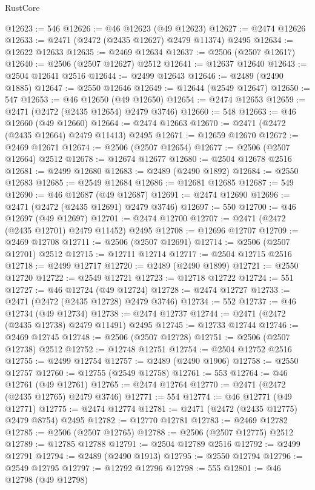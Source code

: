 \begin{lexlean}{RustCore}
\begin{coremodule}
@12623 := 546
@12626 := @46 @12623 (@49 @12623)
@12627 := @2474 @12626
@12633 := @2471 (@2472 (@2435 @12627) @2479 @11374) @2495
@12634 := @12622 @12633
@12635 := @2469 @12634
@12637 := @2506 (@2507 @12617)
@12640 := @2506 (@2507 @12627) @2512
@12641 := @12637 @12640
@12643 := @2504 @12641 @2516
@12644 := @2499 @12643
@12646 := @2489 (@2490 @1885)
@12647 := @2550 @12646
@12649 := @12644 (@2549 @12647)
@12650 := 547
@12653 := @46 @12650 (@49 @12650)
@12654 := @2474 @12653
@12659 := @2471 (@2472 (@2435 @12654) @2479 @3746)
@12660 := 548
@12663 := @46 @12660 (@49 @12660)
@12664 := @2474 @12663
@12670 := @2471 (@2472 (@2435 @12664) @2479 @11413) @2495
@12671 := @12659 @12670
@12672 := @2469 @12671
@12674 := @2506 (@2507 @12654)
@12677 := @2506 (@2507 @12664) @2512
@12678 := @12674 @12677
@12680 := @2504 @12678 @2516
@12681 := @2499 @12680
@12683 := @2489 (@2490 @1892)
@12684 := @2550 @12683
@12685 := @2549 @12684
@12686 := @12681 @12685
@12687 := 549
@12690 := @46 @12687 (@49 @12687)
@12691 := @2474 @12690
@12696 := @2471 (@2472 (@2435 @12691) @2479 @3746)
@12697 := 550
@12700 := @46 @12697 (@49 @12697)
@12701 := @2474 @12700
@12707 := @2471 (@2472 (@2435 @12701) @2479 @11452) @2495
@12708 := @12696 @12707
@12709 := @2469 @12708
@12711 := @2506 (@2507 @12691)
@12714 := @2506 (@2507 @12701) @2512
@12715 := @12711 @12714
@12717 := @2504 @12715 @2516
@12718 := @2499 @12717
@12720 := @2489 (@2490 @1899)
@12721 := @2550 @12720
@12722 := @2549 @12721
@12723 := @12718 @12722
@12724 := 551
@12727 := @46 @12724 (@49 @12724)
@12728 := @2474 @12727
@12733 := @2471 (@2472 (@2435 @12728) @2479 @3746)
@12734 := 552
@12737 := @46 @12734 (@49 @12734)
@12738 := @2474 @12737
@12744 := @2471 (@2472 (@2435 @12738) @2479 @11491) @2495
@12745 := @12733 @12744
@12746 := @2469 @12745
@12748 := @2506 (@2507 @12728)
@12751 := @2506 (@2507 @12738) @2512
@12752 := @12748 @12751
@12754 := @2504 @12752 @2516
@12755 := @2499 @12754
@12757 := @2489 (@2490 @1906)
@12758 := @2550 @12757
@12760 := @12755 (@2549 @12758)
@12761 := 553
@12764 := @46 @12761 (@49 @12761)
@12765 := @2474 @12764
@12770 := @2471 (@2472 (@2435 @12765) @2479 @3746)
@12771 := 554
@12774 := @46 @12771 (@49 @12771)
@12775 := @2474 @12774
@12781 := @2471 (@2472 (@2435 @12775) @2479 @8754) @2495
@12782 := @12770 @12781
@12783 := @2469 @12782
@12785 := @2506 (@2507 @12765)
@12788 := @2506 (@2507 @12775) @2512
@12789 := @12785 @12788
@12791 := @2504 @12789 @2516
@12792 := @2499 @12791
@12794 := @2489 (@2490 @1913)
@12795 := @2550 @12794
@12796 := @2549 @12795
@12797 := @12792 @12796
@12798 := 555
@12801 := @46 @12798 (@49 @12798)

\end{coremodule}
\end{lexlean}
